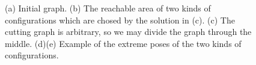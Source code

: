 \documentclass[journal]{IEEEtran}
\begin{document}
\begin{figure}[t]
\centering
{}
\caption{(a) Initial graph. (b) The reachable area of two kinds of configurations which are chosed by the solution in (c). (c) The cutting graph is arbitrary, so we may divide the graph through the middle. (d)(e) Example of the extreme poses of the two kinds of configurations. }\label{fig_realworld_no}
\end{figure}
\end{document}
